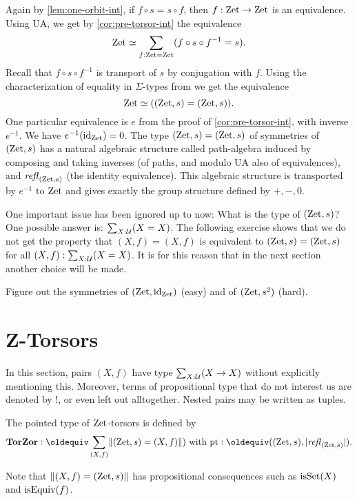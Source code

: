 \documentclass[a4,12pt]{amsart}
\begin{document}
Again by \cref{lem:one-orbit-int}, if $f\circ s = s\circ f$,
then $f: \mathrm{Zet}\to\mathrm{Zet}$ is an equivalence. 
Using UA, we get by \cref{cor:pre-torsor-int} the equivalence
\[
\mathrm{Zet}\simeq \sum_{f:\mathrm{Zet}=\mathrm{Zet}} (f\circ s \circ f^{-1} = s).
\]
Recall that $f\circ s \circ f^{-1}$ is transport of $s$ by
conjugation with $f$. Using the characterization of equality 
in $\Sigma$-types from \cite[Theorem 2.7.2]{hottbook} we get the equivalence
\[
\mathrm{Zet}\simeq ((\mathrm{Zet},s) = (\mathrm{Zet},s)).
\]
One particular equivalence is $e$ from the proof
of \cref{cor:pre-torsor-int}, with inverse $e^{-1}$.
We have $e^{-1}(\mathord{\mathrm{id}}_{\mathrm{Zet}}) = 0$.
The type $(\mathrm{Zet},s) = (\mathrm{Zet},s)$ of symmetries of $(\mathrm{Zet},s)$
has a natural algebraic structure called path-algebra
induced by composing and taking inverses (of paths,
and modulo UA also of equivalences), and $\mathop{{\it refl}_{(\mathrm{Zet},s)}}$
(the identity equivalence).
This algebraic structure is transported by $e^{-1}$ to $\mathrm{Zet}$
and gives exactly the group structure defined by ${+},{-},0$.

One important issue has been ignored up to now:
What is the type of $(\mathrm{Zet},s)$? 
One possible answer is: $\sum_{X:\mathcal{U}}(X=X)$.
The following exercise shows that we do not get the 
property that $(X,f)=(X,f)$ is equivalent to
$(\mathrm{Zet},s) = (\mathrm{Zet},s)$ for all $(X,f) : \sum_{X:\mathcal{U}}(X=X)$.
It is for this reason that in the next section
another choice will be made.

\begin{xca}\label{xca:zet-symmetries}
Figure out the symmetries of $(\mathrm{Zet},\mathord{\mathrm{id}}_{\mathrm{Zet}})$ (easy) and 
of $(\mathrm{Zet},s^2)$ (hard).
\end{xca}

\section{Z-Torsors}\label{sec:ZTorsors}

In this section, pairs $(X,f)$ have type $\sum_{X:\mathcal{U}}(X\to X)$
without explicitly mentioning this. Moreover, terms of
propositional type that do not interest us are denoted by $!$,
or even left out alltogether. Nested pairs may be written as tuples.

\begin{definition}\label{sec:ZTors}
The pointed type of $\mathrm{Zet}$-torsors is defined by
\[
\TorZ\defeq \sum_{(X,f)}\Trunc{(\zet,s)=(X,f)}) \text{~with~}
\pt\defeq ((\zet,s),\trunc{\refl{(\zet,s)}}).
\]
\end{definition}
Note that $\lVert(X,f)=(\mathrm{Zet},s)\rVert$ has propositional consequences
such as $\mathrm{isSet}(X)$ and $\mathrm{isEquiv}(f)$.
\end{document}
